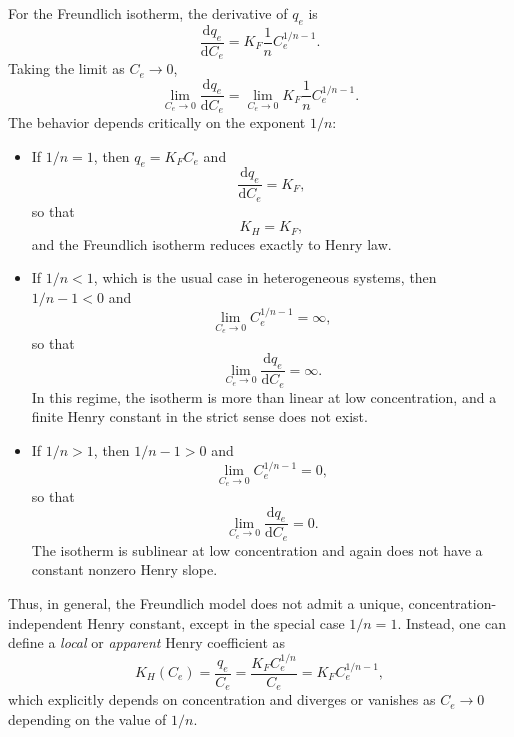 \documentclass[12pt]{article}
\begin{document}
	For the Freundlich isotherm, the derivative of \(q_e\) is
	\begin{equation}
		\frac{\mathrm{d} q_e}{\mathrm{d} C_e}
		= K_F \frac{1}{n} C_e^{1/n - 1}.
	\end{equation}
	Taking the limit as \(C_e \to 0\),
	\begin{equation}
		\lim_{C_e \to 0}
		\frac{\mathrm{d} q_e}{\mathrm{d} C_e}
		= \lim_{C_e \to 0}
		K_F \frac{1}{n} C_e^{1/n - 1}.
	\end{equation}
	The behavior depends critically on the exponent \(1/n\):
	
	\begin{itemize}
		\item If \(1/n = 1\), then \(q_e = K_F C_e\) and
		\begin{equation}
			\frac{\mathrm{d} q_e}{\mathrm{d} C_e} = K_F,
		\end{equation}
		so that
		\begin{equation}
			K_H = K_F,
		\end{equation}
		and the Freundlich isotherm reduces exactly to Henry law.
		
		\item If \(1/n < 1\), which is the usual case in heterogeneous
		systems, then \(1/n - 1 < 0\) and
		\begin{equation}
			\lim_{C_e \to 0} C_e^{1/n - 1} = \infty,
		\end{equation}
		so that
		\begin{equation}
			\lim_{C_e \to 0}
			\frac{\mathrm{d} q_e}{\mathrm{d} C_e} = \infty.
		\end{equation}
		In this regime, the isotherm is more than linear at low concentration,
		and a finite Henry constant in the strict sense does not exist.
		
		\item If \(1/n > 1\), then \(1/n - 1 > 0\) and
		\begin{equation}
			\lim_{C_e \to 0} C_e^{1/n - 1} = 0,
		\end{equation}
		so that
		\begin{equation}
			\lim_{C_e \to 0}
			\frac{\mathrm{d} q_e}{\mathrm{d} C_e} = 0.
		\end{equation}
		The isotherm is sublinear at low concentration and again does not
		have a constant nonzero Henry slope.
	\end{itemize}
	
	Thus, in general, the Freundlich model does not admit a unique,
	concentration-independent Henry constant, except in the special
	case \(1/n = 1\). Instead, one can define a \emph{local} or
	\emph{apparent} Henry coefficient as
	\begin{equation}
		K_H(C_e) = \frac{q_e}{C_e}
		= \frac{K_F C_e^{1/n}}{C_e}
		= K_F C_e^{1/n - 1},
	\end{equation}
	which explicitly depends on concentration and diverges or vanishes
	as \(C_e \to 0\) depending on the value of \(1/n\).
	
\end{document}
